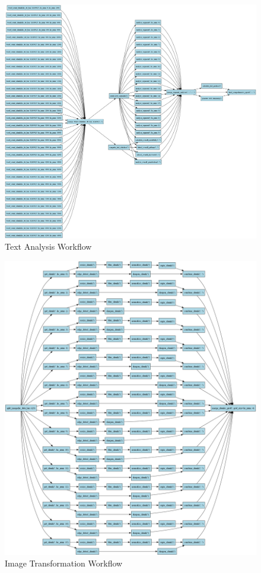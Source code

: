 \documentclass[conference]{IEEEtran}
\begin{document}
\begin{figure}[H]
    \centering
    \includegraphics[width=\columnwidth]{figures/dag_image_text_analysis.png}
    \caption{Text Analysis Workflow}
    \label{fig:text_analysis}
\end{figure}
\begin{figure}[H]
    \centering
    \includegraphics[width=\columnwidth]{figures/dag_image_image_transformer.png}
    \caption{Image Transformation Workflow}
    \label{fig:image_transformer}
\end{figure}
\end{document}
